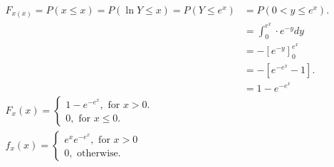 $\begin{aligned} F_{x(x)}=P(x \leq x)=P(\ln Y \leq x)=P\left(Y \leq e^{x}\right) &=P\left(0<y \leq e^{x}\right) . \\ &=\int_{0}^{e^{x}} \cdot e^{-y} d y \\ &=-\left[e^{-y}\right]_{0}^{e^{x}} \\ &=-\left[e^{-e^{x}}-1\right] . \\ &=1-e^{-e^{x}} \\ F_{x}(x)=\left\{\begin{array}{ll}1-e^{-e^{x}}, \text { for } x>0 . \\ 0, \text { for } x \leq 0 .\end{array}\right.& \\ f_{x}(x)=\left\{\begin{array}{ll}e^{x} e^{-e^{x}}, \text { for } x>0 \\ 0, \text { otherwise. }\end{array}\right.\end{aligned}$